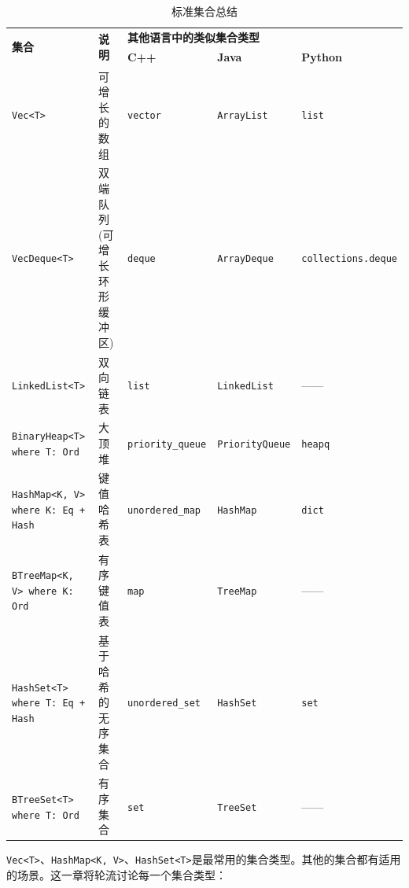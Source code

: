 \begin{table}[htb]
    \centering
    \caption{标准集合总结}
    \label{t16-1}
    \begin{tabular}{p{}p{}lll}
        \hline
        \multirow{2}{*}{\textbf{集合}}  & \multirow{2}{*}{\textbf{说明}} & \multicolumn{3}{l}{\textbf{其他语言中的类似集合类型}} \\
        \cline{3-5}
         & & \textbf{C++} & \textbf{Java} & \textbf{Python} \\
        \hline
        
        \texttt{Vec<T>} & 可增长的数组  & \texttt{vector} & \texttt{ArrayList} & \texttt{list}  \\
        \rowcolor{tablecolor}
        \texttt{VecDeque<T>} & 双端队列(可增长环形缓冲区) & \texttt{deque} & \texttt{ArrayDeque} & \texttt{collections.deque} \\
        \texttt{LinkedList<T>} & 双向链表 & \texttt{list} & \texttt{LinkedList} & —— \\
        \rowcolor{tablecolor}
        \texttt{BinaryHeap<T> where T: Ord} & 大顶堆 & \texttt{priority\_queue} & \texttt{PriorityQueue} & \texttt{heapq} \\
        \texttt{HashMap<K, V> where K: Eq + Hash} & 键值哈希表 & \texttt{unordered\_map} & \texttt{HashMap} & \texttt{dict} \\
        \rowcolor{tablecolor}
        \texttt{BTreeMap<K, V> where K: Ord} & 有序键值表 & \texttt{map} & \texttt{TreeMap} & —— \\
        \texttt{HashSet<T> where T: Eq + Hash} & 基于哈希的无序集合 & \texttt{unordered\_set} & \texttt{HashSet} & \texttt{set} \\
        \rowcolor{tablecolor}
        \texttt{BTreeSet<T> where T: Ord} & 有序集合 & \texttt{set} & \texttt{TreeSet} & —— \\
    \end{tabular}
\end{table}

\texttt{Vec<T>}、\texttt{HashMap<K, V>}、\texttt{HashSet<T>}是最常用的集合类型。其他的集合都有适用的场景。这一章将轮流讨论每一个集合类型：




